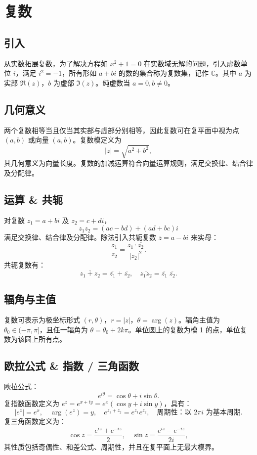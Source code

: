 \documentclass[12pt, a4paper, oneside]{ctexbook}
\begin{document}
\section*{复数}

\subsection*{引入}
从实数拓展复数，为了解决方程如 $x^2+1=0$ 在实数域无解的问题，引入虚数单位 $i$，满足 $i^2 = -1$，所有形如 $a + bi$ 的数的集合称为复数集，记作 $\mathbb{C}$。其中 $a$ 为实部 $\Re(z)$，$b$ 为虚部 $\Im(z)$。纯虚数当 $a=0, b\neq0$。

\subsection*{几何意义}
两个复数相等当且仅当其实部与虚部分别相等，因此复数可在复平面中视为点 $(a,b)$ 或向量 $(a,b)$。复数模定义为
\[
|z| = \sqrt{a^2 + b^2},
\]
其几何意义为向量长度。复数的加减运算符合向量运算规则，满足交换律、结合律及分配律。

\subsection*{运算 \& 共轭}
对复数 $z_1 = a+bi$ 及 $z_2 = c+di$，
\[
z_1 z_2 = (ac - bd) + (ad + bc)i
\]
满足交换律、结合律及分配律。除法引入共轭复数 $\overline{z} = a - bi$ 来实母：
\[
\frac{z_1}{z_2} = \frac{z_1 \cdot \overline{z_2}}{|z_2|^2}.
\]
共轭复数有：
\[
\overline{z_1 + z_2} = \overline{z_1} + \overline{z_2},\quad
\overline{z_1 z_2} = \overline{z_1}\;\overline{z_2}.
\]

\subsection*{辐角与主值}
复数可表示为极坐标形式 $(r, \theta)$，$r = |z|$，$\theta = \arg(z)$。辐角主值为 $\theta_0 \in (-\pi, \pi]$，且任一辐角为 $\theta = \theta_0 + 2k\pi$。单位圆上的复数为模 1 的点，单位复数为该圆上所有点。

\subsection*{欧拉公式 \& 指数 / 三角函数}
欧拉公式：
\[
e^{i\theta} = \cos\theta + i\sin\theta.
\]
复指数函数定义为 $e^z = e^{x+iy} = e^x(\cos y + i\sin y)$，具有：
\[
|e^z| = e^x,\quad \arg(e^z) = y,\quad e^{z_1+z_2}=e^{z_1}e^{z_2},\quad \text{周期性：以 }2\pi i\text{ 为基本周期}.
\]
复三角函数定义为：
\[
\cos z = \frac{e^{iz} + e^{-iz}}{2},\quad \sin z = \frac{e^{iz} - e^{-iz}}{2i},
\]
其性质包括奇偶性、和差公式、周期性，并且在复平面上无最大模界。
\end{document}
